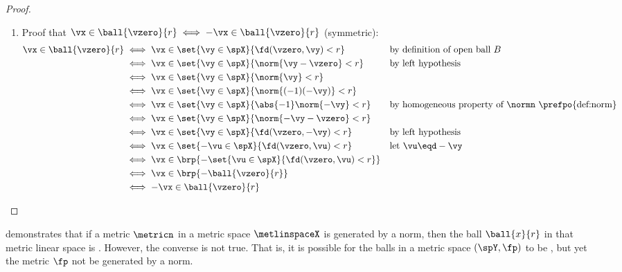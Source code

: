 \begin{proof}
\begin{enumerate}
  \item Proof that $\vx\in \ball{\vzero}{r} \iff -\vx\in \ball{\vzero}{r}$ (symmetric):
        \begin{align*}
          \vx\in \ball{\vzero}{r} 
            &\iff \vx\in\set{\vy\in\spX}{\fd(\vzero,\vy)<r}
            &&    \text{by definition of open ball $B$}
          \\&\iff \vx\in\set{\vy\in\spX}{\norm{\vy-\vzero}<r}
            &&    \text{by left hypothesis}
          \\&\iff \vx\in\set{\vy\in\spX}{\norm{\vy}<r}
          \\&\iff \vx\in\set{\vy\in\spX}{\norm{(-1)(-\vy)}<r}
          \\&\iff \vx\in\set{\vy\in\spX}{\abs{-1}\norm{-\vy}<r}
            &&    \text{by homogeneous property of $\normn$ \prefpo{def:norm}}
          \\&\iff \vx\in\set{\vy\in\spX}{\norm{-\vy-\vzero}<r}
          \\&\iff \vx\in\set{\vy\in\spX}{\fd(\vzero,-\vy)<r}
            &&    \text{by left hypothesis}
          \\&\iff \vx\in\set{-\vu\in\spX}{\fd(\vzero,\vu)<r}
            &&    \text{let $\vu\eqd -\vy$}
          \\&\iff \vx\in \brp{-\set{\vu\in\spX}{\fd(\vzero,\vu)<r}}
          \\&\iff \vx\in \brp{-\ball{\vzero}{r}}
          \\&\iff -\vx\in \ball{\vzero}{r}
        \end{align*}
\end{enumerate}
\end{proof}


 demonstrates that if a metric $\metricn$ in a metric space $\metlinspaceX$
is generated by a norm,
then the ball $\ball{x}{r}$ in that metric linear space is .
However, the converse is not true.
That is, it is possible for the balls in a metric space $(\spY,\fp)$ to be ,
but yet the metric $\fp$ not be generated by a norm.




